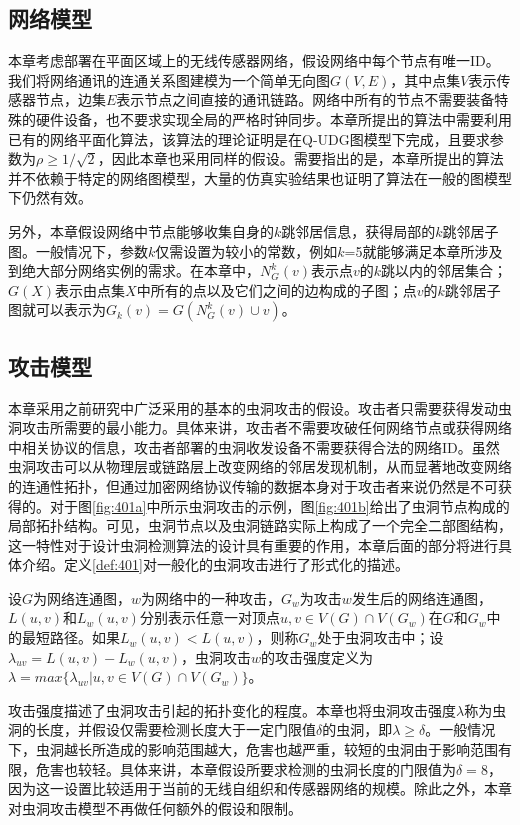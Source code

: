 \subsection{网络模型}
本章考虑部署在平面区域上的无线传感器网络，假设网络中每个节点有唯一ID。我们将网络通讯的连通关系图建模为一个简单无向图$G(V,E)$，其中点集$V$表示传感器节点，边集$E$表示节点之间直接的通讯链路。网络中所有的节点不需要装备特殊的硬件设备，也不要求实现全局的严格时钟同步。本章所提出的算法中需要利用已有的网络平面化算法，该算法的理论证明是在Q-UDG图模型下完成，且要求参数为$\rho\ge1/\sqrt{2}$，因此本章也采用同样的假设。需要指出的是，本章所提出的算法并不依赖于特定的网络图模型，大量的仿真实验结果也证明了算法在一般的图模型下仍然有效。

另外，本章假设网络中节点能够收集自身的$k$跳邻居信息，获得局部的$k$跳邻居子图。一般情况下，参数$k$仅需设置为较小的常数，例如$k$=5就能够满足本章所涉及到绝大部分网络实例的需求。在本章中，$N_G^k(v)$表示点$v$的$k$跳以内的邻居集合；$G(X)$表示由点集$X$中所有的点以及它们之间的边构成的子图；点$v$的$k$跳邻居子图就可以表示为$G_k(v)=G(N_G^k(v)\cup{v})$。
\subsection{攻击模型}
本章采用之前研究中广泛采用的基本的虫洞攻击的假设。攻击者只需要获得发动虫洞攻击所需要的最小能力。具体来讲，攻击者不需要攻破任何网络节点或获得网络中相关协议的信息，攻击者部署的虫洞收发设备不需要获得合法的网络ID。虽然虫洞攻击可以从物理层或链路层上改变网络的邻居发现机制，从而显著地改变网络的连通性拓扑，但通过加密网络协议传输的数据本身对于攻击者来说仍然是不可获得的。对于图\ref{fig:401a}中所示虫洞攻击的示例，图\ref{fig:401b}给出了虫洞节点构成的局部拓扑结构。可见，虫洞节点以及虫洞链路实际上构成了一个完全二部图结构，这一特性对于设计虫洞检测算法的设计具有重要的作用，本章后面的部分将进行具体介绍。定义\ref{def:401}对一般化的虫洞攻击进行了形式化的描述。
\begin{definition}\label{def:401}
设$G$为网络连通图，$w$为网络中的一种攻击，$G_w$为攻击$w$发生后的网络连通图，$L(u,v)$和$L_w(u,v)$分别表示任意一对顶点$u,v\in{V(G)\cap{V(G_w)}}$在$G$和$G_w$中的最短路径。如果$L_w(u,v)<L(u,v)$，则称$G_w$处于虫洞攻击中；设$\lambda_{uv}=L(u,v)-L_w(u,v)$，虫洞攻击$w$的攻击强度定义为$\lambda=max\{\lambda_{uv}|u,v\in{V(G)\cap{V(G_w)}}\}$。
\end{definition}

攻击强度描述了虫洞攻击引起的拓扑变化的程度。本章也将虫洞攻击强度$\lambda$称为虫洞的长度，并假设仅需要检测长度大于一定门限值$\delta$的虫洞，即$\lambda\ge\delta$。一般情况下，虫洞越长所造成的影响范围越大，危害也越严重，较短的虫洞由于影响范围有限，危害也较轻。具体来讲，本章假设所要求检测的虫洞长度的门限值为$\delta=8$，因为这一设置比较适用于当前的无线自组织和传感器网络的规模。除此之外，本章对虫洞攻击模型不再做任何额外的假设和限制。
